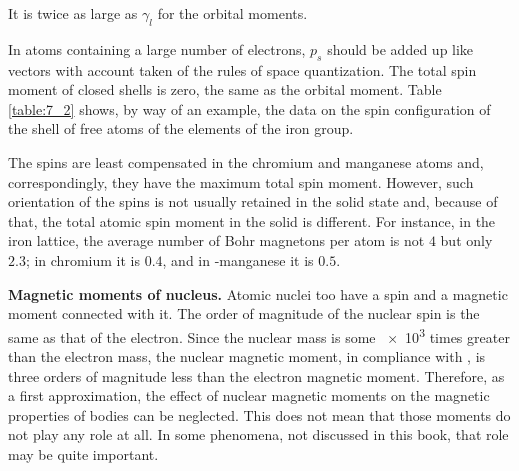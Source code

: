 \noindent
It is twice as large as $\gamma_l$ for the orbital moments.

In atoms containing a large number of electrons, $p_s$ should be added up like vectors with account taken of the rules of space quantization. The total spin moment of closed shells is zero, the same as the orbital moment. Table \ref{table:7_2} shows, by way of an example, the data on the spin configuration of the  shell of free atoms of the elements of the iron group.

\begin{table}[!b]
	\renewcommand{\arraystretch}{1.2}
	\caption{}
	\vspace{-0.6cm}
	\label{table:7_2}
	\begin{center}\end{center}
\end{table}

The spins are least compensated in the chromium and manganese atoms and, correspondingly, they have the maximum total spin moment. However, such orientation of the spins is not usually retained in the solid state and, because of that, the total atomic spin moment in the solid is different. For instance, in the iron lattice, the average number of Bohr magnetons per atom is not $4$ but only $2.3$; in chromium it is $0.4$, and in \ce{\alpha}-manganese it is $0.5$.

\textbf{Magnetic moments of nucleus.} Atomic nuclei too have a spin and a magnetic moment connected with it. The order of magnitude of the nuclear spin is the same as that of the electron. Since the nuclear mass is some \num{e3} times greater than the electron mass, the nuclear magnetic moment, in compliance with , is three orders of magnitude less than the electron magnetic moment. Therefore, as a first approximation, the effect of nuclear magnetic moments on the magnetic properties of bodies can be neglected. This does not mean that those moments do not play any role at all. In some phenomena, not discussed in this book, that role may be quite important.

